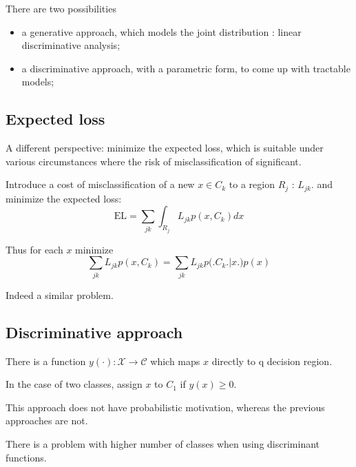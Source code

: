 \documentclass[a4paper]{article}
\newcommand{\Ccal}{\mathcal{C}}
\begin{document}
There are two possibilities \begin{itemize}
	\item a generative approach, which models the joint distribution : linear discriminative analysis;
	\item a discriminative approach, with a parametric form, to come up with tractable models;
\end{itemize}


\subsection{Expected loss} %
\label{sub:expected_loss}

A different perspective: minimize the expected loss, which is suitable under various circumstances where the risk of misclassification of significant.

Introduce a cost of misclassification of a new $x\in C_k$ to a region $R_j$ : $L_{jk}$.
and minimize the expected loss:
\[\text{EL} = \sum_{jk} \int_{R_j} L_{jk} p(x, C_k) dx\]

Thus for each $x$ minimize 
\[\sum_{jk} L_{jk} p(x, C_k) = \sum_{jk} L_{jk} p\big(\big. C_k\big.\big\rvert x\big.\big) p(x)\]

Indeed a similar problem.

\subsection{Discriminative approach} %
\label{sub:discriminative_approach}

There is a function $y(\cdot):\mathcal{X}\to \Ccal$ which maps $x$ directly to q decision region.

In the case of two classes, assign $x$ to $C_1$ if $y(x) \geq 0$.

This approach does not have probabilistic motivation, whereas the previous approaches are not.

There is a problem with higher number of classes when using discriminant functions.
\end{document}
